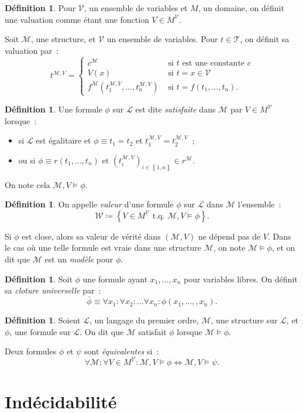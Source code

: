 \documentclass{article}
\theoremstyle{definition}
\newtheorem{déf}[thm]{Définition}
\theoremstyle{remark}
\newcommand{\intint}[2]{\left\llbracket#1, #2\right\rrbracket}
\newcommand{\tq}{\text{ t.q. }}
\begin{document}
	\begin{déf} Pour $\mathcal V$, un ensemble de variables et $M$, un domaine, on définit une valuation comme étant une fonction $V \in M^{\mathcal V}$.

	Soit $\mathcal M$, une structure, et $\mathcal V$ un ensemble de variables. Pour $t \in \mathcal T$, on définit sa valuation par~:
	\[t^{\mathcal M,V} = \begin{cases}
		c^{\mathcal M} &\text{ si $t$ est une constante $c$} \\
		V(x) &\text{ si } t=x \in \mathcal V\\
		f^{\mathcal M}(t_1^{\mathcal M,V}, \ldots, t_n^{\mathcal M,V}) &\text{ si } t = f(t_1, \ldots, t_n).
		\end{cases}\]
	\end{déf}

	\begin{déf} Une formule $\phi$ sur $\mathcal L$ est dite \textit{satisfaite} dans $\mathcal M$ par $V \in M^{\mathcal V}$ lorsque~:
	\begin{itemize}
		\item si $\mathcal L$ est égalitaire et $\phi \equiv t_1 = t_2$ et $t_1^{\mathcal M,V}=t_2^{\mathcal M,V}$~;
		\item ou si $\phi \equiv r(t_1, \ldots, t_n)$ et $(t_i^{\mathcal M,V})_{i \in \intint 1n} \in r^{\mathcal M}$.
	\end{itemize}
	On note cela $\mathcal M,V \models \phi$.
	\end{déf}

	\begin{déf} On appelle \textit{valeur} d'une formule $\phi$ sur $\mathcal L$ dans $\mathcal M$ l'ensemble~:
	\[\mathcal W \coloneqq \left\{V \in M^{\mathcal V} \tq \mathcal M,V \models \phi\right\}.\]
	\end{déf}

	Si $\phi$ est close, alors sa valeur de vérité dans $(\mathcal M, V)$ ne dépend pas de $V$. Dans le cas où une telle formule est vraie dans
	une structure $\mathcal M$, on note $\mathcal M \models \phi$, et on dit que $\mathcal M$ est un \textit{modèle} pour $\phi$.

	\begin{déf} Soit $\phi$ une formule ayant $x_1, \ldots, x_n$ pour variables libres. On définit sa \textit{cloture universelle} par~:
	\[\overline \phi \equiv \forall x_1 : \forall x_2 : \ldots \forall x_n : \phi(x_1, \ldots, ,x_n).\]
	\end{déf}

	\begin{déf} Soient $\mathcal L$, un langage du premier ordre, $\mathcal M$, une structure sur $\mathcal L$, et $\phi$, une formule sur $\mathcal L$.
	On dit que $\mathcal M$ satisfait $\phi$ lorsque $\mathcal M \models \overline \phi$.

	Deux formules $\phi$ et $\psi$ sont \textit{équivalentes} si~:
	\[\forall \mathcal M : \forall V \in M^{\mathcal V} : \mathcal M,V \models \phi \Leftrightarrow \mathcal M,V \models \psi.\]
	\end{déf}

\section{Indécidabilité}
\end{document}
